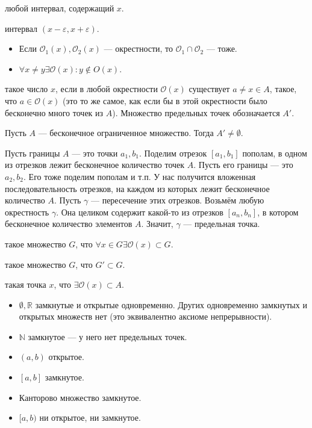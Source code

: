 \documentclass[12pt,a4paper]{article}
\begin{document}
 любой интервал, содержащий $x$.

 интервал $(x-\varepsilon,x+\varepsilon)$.


\begin{itemize}
	\item Если $\mathcal O_1(x),\mathcal O_2(x)$ --- окрестности, то $\mathcal O_1\cap \mathcal O_2$ --- тоже.
	\item $\forall x\neq y\exists \mathcal O(x):y\notin O(x)$.
\end{itemize}

 такое число $x$, если в любой окрестности $\mathcal O(x)$ существует $a\neq x\in A$, такое, что $a\in\mathcal O(x)$ (это то же самое, как если бы в этой окрестности было бесконечно много точек из $A$). Множество предельных точек обозначается $A'$.

\theorem Пусть $A$ --- бесконечное ограниченное множество. Тогда $A'\neq\emptyset$.

\proof Пусть границы $A$ --- это точки $a_1,b_1$. Поделим отрезок $[a_1,b_1]$ пополам, в одном из отрезков лежит бесконечное количество точек $A$. Пусть его границы --- это $a_2,b_2$. Его тоже поделим пополам и т.п. У нас получится вложенная последовательность отрезков, на каждом из которых лежит бесконечное количество $A$. Пусть $\gamma$ --- пересечение этих отрезков. Возьмём любую окрестность $\gamma$. Она целиком содержит какой-то из отрезков $[a_n,b_n]$, в котором бесконечное количество элементов $A$. Значит, $\gamma$ --- предельная точка.\QEDA

\newpage

 такое множество $G$, что $\forall x\in G\exists \mathcal O(x)\subset G$.

 такое множество $G$, что $G'\subset G$.

 такая точка $x$, что $\exists\mathcal O(x)\subset A$.


\begin{itemize}
	\item $\emptyset,\mathbb R$ замкнутые и открытые одновременно. Других одновременно замкнутых и открытых множеств нет (это эквивалентно аксиоме непрерывности).
	\item $\mathbb N$ замкнутое --- у него нет предельных точек.
	\item $(a,b)$ открытое.
	\item $[a,b]$ замкнутое.
	\item Канторово множество замкнутое.
	\item $[a,b)$ ни открытое, ни замкнутое.
\end{itemize}
\end{document}
